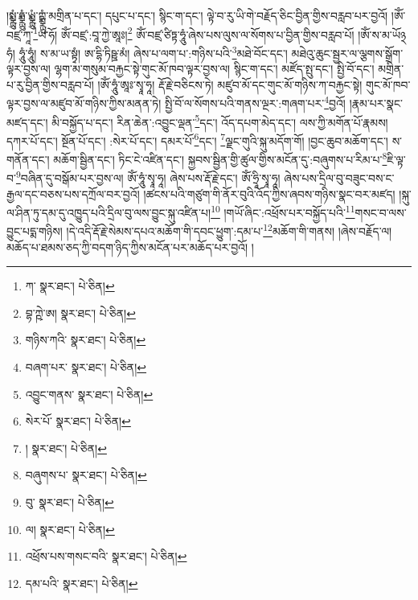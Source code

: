 །སྨྼྻུཾ་ཧྨྼྻུཾ་ཡྨྼྻུཾ་ཀྵྨྼྻུཾ་མགྲིན་པ་དང་། དཔུང་པ་དང་། སྙིང་ག་དང་། ལྟེ་བ་རུ་ཡི་གེ་བརྗོད་ཅིང་བྱིན་གྱིས་བརླབ་པར་བྱའོ། །ཨོཾ་བཛྲ་ཀཱ་\footnote{ཀ་  སྣར་ཐང་།  པེ་ཅིན། }ཡ་ཧོ། ཨོཾ་བཛྲ་:བཱ་ཀྱེ་ཨཱཿ།\footnote{བྷ་ཀྵེ་ཨ།  སྣར་ཐང་།  པེ་ཅིན། } ཨོཾ་བཛྲ་ཙིཏྟ་ཧཱུཾ་ཞེས་པས་ལུས་ལ་སོགས་པ་བྱིན་གྱིས་བརླབ་པོ། །ཨོཾ་ས་མ་ཡོ྅ཧཾ། ཧཱུཾ་ཧཱུཾ། ས་མ་ཡ་སྟྭཾ། ཨ་དྷི་ཏིཥྛ་མཾ། ཞེས་པ་ལག་པ་:གཉིས་པའི་\footnote{གཉིས་ཀའི་  སྣར་ཐང་།  པེ་ཅིན། }མཐེ་བོང་དང་། མཐེའུ་ཆུང་སྦྱར་ལ་ལྕགས་སྒྲོག་ལྟར་བྱས་ལ། ལྷག་མ་གསུམ་བརྐྱང་སྟེ་གུང་མོ་ཁབ་ལྟར་བྱས་ལ། སྙིང་ག་དང་། མཛོད་སྤུ་དང་། སྤྱི་བོ་དང་། མགྲིན་པ་རུ་བྱིན་གྱིས་བརླབ་པོ། །ཨོཾ་ཧཱུཾ་ཨཱཿ་སྭཱ་ཧཱ། རྡོ་རྗེ་བཅིངས་ཏེ། མཛུབ་མོ་དང་གུང་མོ་གཉིས་ཀ་བརྐྱང་སྟེ། གུང་མོ་ཁབ་ལྟར་བྱས་ལ་མཛུབ་མོ་གཉིས་ཀྱིས་མནན་ཏེ། སྤྱི་བོ་ལ་སོགས་པའི་གནས་ལྔར་:གཞག་པར་\footnote{བཞག་པར་  སྣར་ཐང་།  པེ་ཅིན། }བྱའོ། །རྣམ་པར་སྣང་མཛད་དང་། མི་བསྐྱོད་པ་དང་། རིན་ཆེན་:འབྱུང་ལྡན་\footnote{འབྱུང་གནས་  སྣར་ཐང་།  པེ་ཅིན། }དང་། འོད་དཔག་མེད་དང་། ལས་ཀྱི་མགོན་པོ་རྣམས། དཀར་པོ་དང་། སྔོན་པོ་དང་། :སེར་པོ་དང་། དམར་པོ་\footnote{སེར་པོ་  སྣར་ཐང་།  པེ་ཅིན། }དང་། \footnote{།    སྣར་ཐང་།  པེ་ཅིན། }ལྗང་གུའི་སྐུ་མདོག་གོ། །བྱང་ཆུབ་མཆོག་དང་། ས་གནོན་དང་། མཆོག་སྦྱིན་དང་། ཏིང་ངེ་འཛིན་དང་། སྐྱབས་སྦྱིན་གྱི་ཚུལ་གྱིས་མངོན་དུ་:བཞུགས་པ་རིམ་པ་\footnote{བཞུགས་པ་  སྣར་ཐང་།  པེ་ཅིན། }ཇི་ལྟ་བ་\footnote{བུ་  སྣར་ཐང་།  པེ་ཅིན། }བཞིན་དུ་བསྒོམ་པར་བྱས་ལ། ཨོཾ་ཧཱུཾ་སྭཱ་ཧཱ། ཞེས་པས་རྡོ་རྗེ་དང་། ཨོཾ་ཧྲཱི་སྭཱ་ཧཱ། ཞེས་པས་དྲིལ་བུ་བཟུང་བས་ང་རྒྱལ་དང་བཅས་པས་དཀྲོལ་བར་བྱའོ། །ཚངས་པའི་གཙུག་གི་ནོར་བུའི་འོད་ཀྱིས་ཞབས་གཉིས་སྣང་བར་མཛད། །སྐུ་ལ་ཤིན་ཏུ་དམ་དུ་འཁྱུད་པའི་དྲིལ་བུ་ལས་བྱུང་སྐུ་འཛིན་པ།\footnote{ལ།  སྣར་ཐང་།  པེ་ཅིན། } །གཡོ་ཞིང་:འཕྲོས་པར་བསྐྱོད་པའི་\footnote{འཕྲོས་པས་གསང་བའི་  སྣར་ཐང་།  པེ་ཅིན། }གསང་བ་ལས་བྱུང་པདྨ་གཉིས། །དེ་འདི་རྡོ་རྗེ་སེམས་དཔའ་མཆོག་གི་དབང་ཕྱུག་:དམ་པ་\footnote{དམ་པའི་  སྣར་ཐང་།  པེ་ཅིན། }མཆོག་གི་གནས། །ཞེས་བརྗོད་ལ། མཆོད་པ་ཐམས་ཅད་ཀྱི་བདག་ཉིད་ཀྱིས་མངོན་པར་མཆོད་པར་བྱའོ། །
